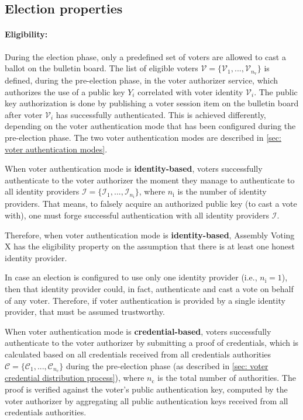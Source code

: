 \subsection{Election properties} \label{sec: election properties}


\paragraph{Eligibility:}
During the election phase, only a predefined set of voters are allowed to cast a ballot on the bulletin board. The list of eligible voters $\boldsymbol{\mathcal{V}} = \{ \mathcal{V}_1, ..., \mathcal{V}_{n_\mathrm{v}} \}$ is defined, during the pre-election phase, in the voter authorizer service, which authorizes the use of a public key $Y_i$ correlated with voter identity $\mathcal{V}_i$. The public key authorization is done by publishing a voter session item on the bulletin board after voter $\mathcal{V}_i$ has successfully authenticated. This is achieved differently, depending on the voter authentication mode that has been configured during the pre-election phase. The two voter authentication modes are described in \cref{sec: voter authentication modes}.

When voter authentication mode is \textbf{identity-based}, voters successfully authenticate to the voter authorizer the moment they manage to authenticate to all identity providers $\boldsymbol{\mathcal{I}} = \{ \mathcal{I}_1, ..., \mathcal{I}_{n_\mathrm{i}} \}$, where $n_\mathrm{i}$ is the number of identity providers. That means, to falsely acquire an authorized public key (to cast a vote with), one must forge successful authentication with all identity providers $\boldsymbol{\mathcal{I}}$.

Therefore, when voter authentication mode is \textbf{identity-based}, Assembly Voting X has the eligibility property on the assumption that there is at least one honest identity provider.

In case an election is configured to use only one identity provider (i.e., $n_\mathrm{i} = 1$), then that identity provider could, in fact, authenticate and cast a vote on behalf of any voter. Therefore, if voter authentication is provided by a single identity provider, that must be assumed trustworthy.

When voter authentication mode is \textbf{credential-based}, voters successfully authenticate to the voter authorizer by submitting a proof of credentials, which is calculated based on all credentials received from all credentials authorities $\boldsymbol{\mathcal{C}} = \{ \mathcal{C}_1, ..., \mathcal{C}_{n_\mathrm{c}} \}$ during the pre-election phase (as described in \cref{sec: voter credential distribution process}), where $n_\mathrm{c}$ is the total number of authorities. The proof is verified against the voter's public authentication key, computed by the voter authorizer by aggregating all public authentication keys received from all credentials authorities.

